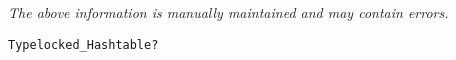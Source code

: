 \label{pkg:unt\_hashtable}

{\tiny \it The above information is manually maintained and may contain errors.}
\begin{verbatim}
Typelocked_Hashtable?
\end{verbatim}
